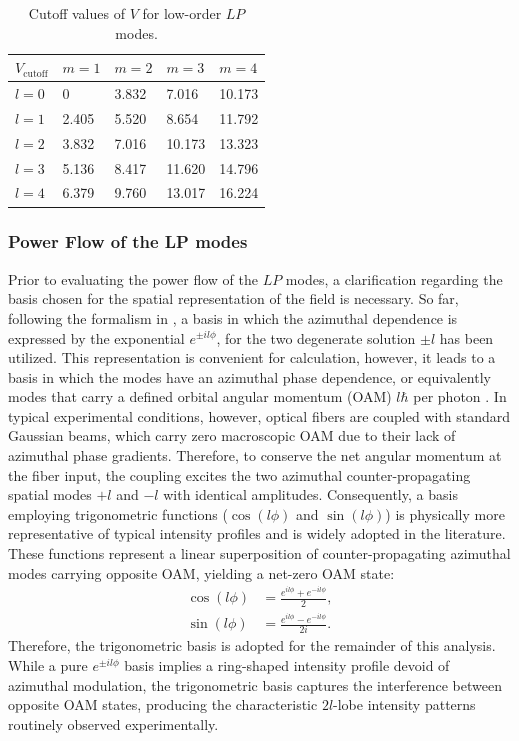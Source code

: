 \begin{table}[htbp]
\centering
\caption{Cutoff values of $V$ for low-order $LP$ modes.}
\begin{tabular}{C{1.5cm}C{1.5cm}C{1.5cm}C{1.5cm}C{1.5cm}}
\toprule
$V_{\text{cutoff}}$ & $m = 1$ & $m = 2$ & $m = 3$ & $m = 4$ \\
\midrule
$l = 0$ & 0     & 3.832 & 7.016  & 10.173 \\
$l = 1$ & 2.405 & 5.520 & 8.654  & 11.792 \\
$l = 2$ & 3.832 & 7.016 & 10.173 & 13.323 \\
$l = 3$ & 5.136 & 8.417 & 11.620 & 14.796 \\
$l = 4$ & 6.379 & 9.760 & 13.017 & 16.224 \\
\bottomrule
\end{tabular}
\label{tab:cutoff_values}
\end{table}

\subsubsection{Power Flow of the LP modes}

Prior to evaluating the power flow of the  $LP$ modes, a clarification regarding the basis chosen for the spatial representation of the field is necessary. So far, following the formalism in \cite{yariv2007photonics}, a basis in which the azimuthal dependence is expressed by the exponential $e^{\pm il\phi}$, for the two degenerate solution $\pm l$ has been utilized. This representation is convenient for calculation, however, it leads to a basis in which the modes have an azimuthal phase dependence, or equivalently modes that carry a defined orbital angular momentum (OAM) $l\hbar$ per photon \cite{Allen:92}.
In typical experimental conditions, however, optical fibers are coupled with standard Gaussian beams, which carry zero macroscopic OAM due to their lack of azimuthal phase gradients. Therefore, to conserve the net angular momentum at the fiber input, the coupling excites the two azimuthal counter-propagating spatial modes $+l$ and $-l$ with identical amplitudes.
Consequently, a basis employing trigonometric functions ($\cos(l\phi)$ and $\sin(l\phi)$) is physically more representative of typical intensity profiles and is widely adopted in the literature. These functions represent a linear superposition of counter-propagating azimuthal modes carrying opposite OAM, yielding a net-zero OAM state:
\begin{equation}
    \begin{aligned}
        \cos(l\phi) &= \frac{e^{il\phi} + e^{-il\phi}}{2}, \\
        \sin(l\phi) &= \frac{e^{il\phi} - e^{-il\phi}}{2i}.
    \end{aligned}
\end{equation}
Therefore, the trigonometric basis is adopted for the remainder of this analysis. While a pure $e^{\pm il\phi}$ basis implies a ring-shaped intensity profile devoid of azimuthal modulation, the trigonometric basis captures the interference between opposite OAM states, producing the characteristic $2l$-lobe intensity patterns routinely observed experimentally.

